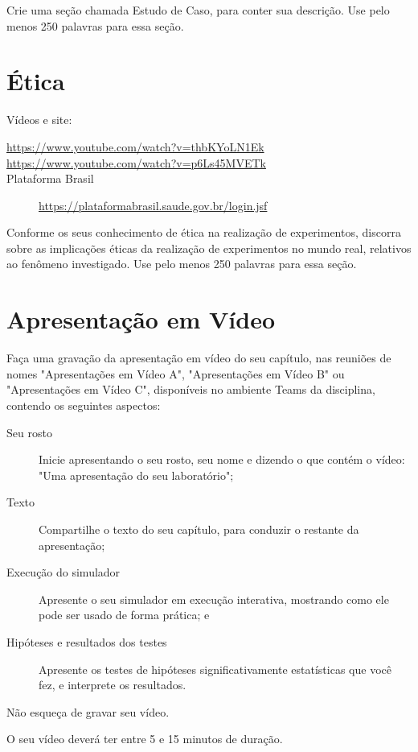 Crie uma seção chamada Estudo de Caso, para conter sua descrição.
Use pelo menos 250 palavras para essa seção.  

\section{Ética}

Vídeos e site:
\begin{description}
    \item [\url{https://www.youtube.com/watch?v=thbKYoLN1Ek}]
    \item [\url{https://www.youtube.com/watch?v=p6Ls45MVETk}]
    \item [Plataforma Brasil] \url{https://plataformabrasil.saude.gov.br/login.jsf}
\end{description}

Conforme os seus conhecimento de ética na realização de experimentos, discorra sobre as implicações éticas da realização de experimentos no mundo real, relativos ao fenômeno investigado.
Use pelo menos 250 palavras para essa seção.  

\section{Apresentação em Vídeo}
 
 Faça uma gravação da apresentação em vídeo do seu capítulo, nas reuniões de nomes "Apresentações em Vídeo A", "Apresentações em Vídeo B" ou "Apresentações em Vídeo C", disponíveis no ambiente Teams da disciplina, contendo os seguintes aspectos:
 \begin{description}
     \item [Seu rosto] Inicie apresentando o seu rosto, seu nome e dizendo o que contém o vídeo: "Uma apresentação do seu laboratório";
     \item [Texto] Compartilhe o texto do seu capítulo, para conduzir o restante da apresentação;
     \item [Execução do simulador] Apresente o seu simulador em execução interativa, mostrando como ele pode ser usado de forma prática; e
     \item [Hipóteses e resultados dos testes] Apresente os testes de hipóteses significativamente estatísticas que você fez, e interprete os resultados. 
 \end{description}
Não esqueça de gravar seu vídeo.

O seu vídeo deverá ter entre 5 e 15 minutos de duração.


